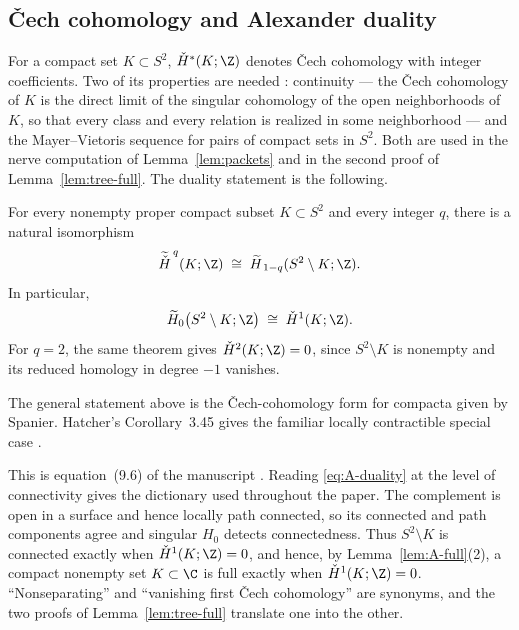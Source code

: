 \subsection{\v{C}ech cohomology and Alexander duality}
\label{subsec:A-duality}

For a compact set $K\subset S^2$, $\check H^*(K;\Z)$ denotes \v{C}ech
cohomology with integer coefficients.  Two of its properties are needed
\cite[Chapter~6]{Spa66}: continuity --- the \v{C}ech cohomology of $K$ is the direct
limit of the singular cohomology of the open neighborhoods of $K$, so
that every class and every relation is realized in some neighborhood ---
and the Mayer--Vietoris sequence for pairs of compact sets in $S^2$.
Both are used in the nerve computation of Lemma~\ref{lem:packets} and in
the second proof of Lemma~\ref{lem:tree-full}.  The duality statement is
the following.

\begin{theorem}\label{thm:A-duality}
For every nonempty proper compact subset $K\subset S^2$ and every integer
$q$, there is a natural isomorphism
\[
\widetilde{\check H}^{\,q}(K;\Z)
\;\cong\;
\widetilde H_{\,1-q}(S^2\setminus K;\Z).
\]
In particular,
\begin{equation}\label{eq:A-duality}
\widetilde H_0\bigl(S^2\setminus K;\Z\bigr)\;\cong\;\check H^1(K;\Z).
\end{equation}
For $q=2$, the same theorem gives $\check H^2(K;\Z)=0$, since
$S^2\setminus K$ is nonempty and its reduced homology in degree $-1$
vanishes.
\end{theorem}

The general statement above is the \v{C}ech-cohomology form for compacta
given by Spanier.  Hatcher's Corollary~3.45 gives the familiar locally
contractible special case \cite[pp.~255--257]{Hat02}.

This is equation~(9.6) of the manuscript \cite{MWman}.  Reading
\eqref{eq:A-duality} at the level of connectivity gives the dictionary
used throughout the paper.  The complement is open in a surface and hence
locally path connected, so its connected and path components agree and
singular $H_0$ detects connectedness.  Thus $S^2\setminus K$ is connected exactly when
$\check H^1(K;\Z)=0$, and hence, by Lemma~\ref{lem:A-full}(2), a compact
nonempty set $K\subset\C$ is full exactly when
$\check H^1(K;\Z)=0$.
``Nonseparating'' and ``vanishing first \v{C}ech cohomology'' are
synonyms, and the two proofs of Lemma~\ref{lem:tree-full} translate one
into the other.


